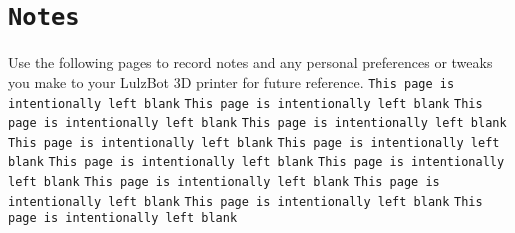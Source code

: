 %
%
%
%
%


\section{\texttt{Notes}}
Use the following pages to record notes and any personal preferences or tweaks you make to your LulzBot 3D printer for future reference.
\thispagestyle{empty}
\begingroup
\newpage
\mbox{}
\null
\vfill
\thispagestyle{empty}
\texttt{This page is intentionally left blank}
\newpage
\mbox{}
\null
\vfill
\thispagestyle{empty}
\texttt{This page is intentionally left blank}
\newpage
\mbox{}
\null
\vfill
\thispagestyle{empty}
\texttt{This page is intentionally left blank}
\newpage
\mbox{}
\null
\vfill
\thispagestyle{empty}
\texttt{This page is intentionally left blank}
\newpage
\mbox{}
\null
\vfill
\thispagestyle{empty}
\texttt{This page is intentionally left blank}
\newpage
\mbox{}
\null
\vfill
\thispagestyle{empty}
\texttt{This page is intentionally left blank}
\newpage
\mbox{}
\null
\vfill
\thispagestyle{empty}
\texttt{This page is intentionally left blank}
\newpage
\mbox{}
\null
\vfill
\thispagestyle{empty}
\texttt{This page is intentionally left blank}
\newpage
\mbox{}
\null
\vfill
\thispagestyle{empty}
\texttt{This page is intentionally left blank}
\newpage
\mbox{}
\null
\vfill
\thispagestyle{empty}
\texttt{This page is intentionally left blank}
\newpage
\mbox{}
\null
\vfill
\thispagestyle{empty}
\texttt{This page is intentionally left blank}
\newpage
\mbox{}
\null
\vfill
\thispagestyle{empty}
\texttt{This page is intentionally left blank}
\endgroup
